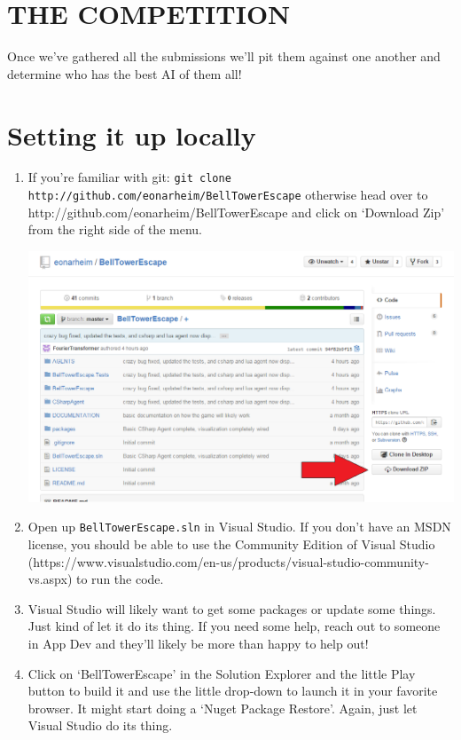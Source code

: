 \documentclass{article}
\begin{document}
\section*{THE COMPETITION}
Once we've gathered all the submissions we'll pit them against one another and determine who has the best AI of them all!

\newpage
\section*{Setting it up locally}
\begin{enumerate}
\item If you're familiar with git: \verb|git clone http://github.com/eonarheim/BellTowerEscape| otherwise head over to http://github.com/eonarheim/BellTowerEscape and click on `Download Zip' from the right side of the menu.

\includegraphics[width=6.5in]{1-DownloadZip.png}

\item Open up \verb|BellTowerEscape.sln| in Visual Studio. If you don't have an MSDN license, you should be able to use the Community Edition of Visual Studio (https://www.visualstudio.com/en-us/products/visual-studio-community-vs.aspx) to run the code.

\item Visual Studio will likely want to get some packages or update some things. Just kind of let it do its thing. If you need some help, reach out to someone in App Dev and they'll likely be more than happy to help out!

\item Click on `BellTowerEscape' in the Solution Explorer and the little Play button to build it and use the little drop-down to launch it in your favorite browser. It might start doing a `Nuget Package Restore'. Again, just let Visual Studio do its thing.


\end{enumerate}
\end{document}
